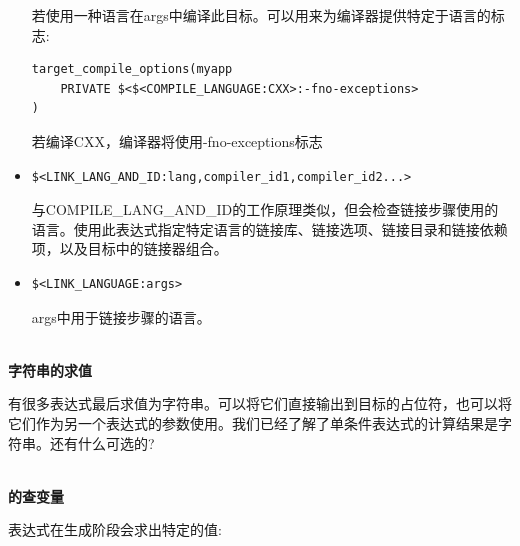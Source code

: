 \begin{itemize}
若使用一种语言在args中编译此目标。可以用来为编译器提供特定于语言的标志:

\begin{lstlisting}[style=styleCMake]
target_compile_options(myapp
	PRIVATE $<$<COMPILE_LANGUAGE:CXX>:-fno-exceptions>
)
\end{lstlisting}

若编译CXX，编译器将使用-fno-exceptions标志

\item 
\begin{lstlisting}[style=styleCMake]
$<LINK_LANG_AND_ID:lang,compiler_id1,compiler_id2...>
\end{lstlisting}

与COMPILE\_LANG\_AND\_ID的工作原理类似，但会检查链接步骤使用的语言。使用此表达式指定特定语言的链接库、链接选项、链接目录和链接依赖项，以及目标中的链接器组合。

\item 
\begin{lstlisting}[style=styleCMake]
$<LINK_LANGUAGE:args>
\end{lstlisting}

args中用于链接步骤的语言。
\end{itemize}

\hspace*{\fill} \\ %
\noindent
\textbf{字符串的求值}

有很多表达式最后求值为字符串。可以将它们直接输出到目标的占位符，也可以将它们作为另一个表达式的参数使用。我们已经了解了单条件表达式的计算结果是字符串。还有什么可选的?

\hspace*{\fill} \\ %
\noindent
\textbf{的查变量}

表达式在生成阶段会求出特定的值:

